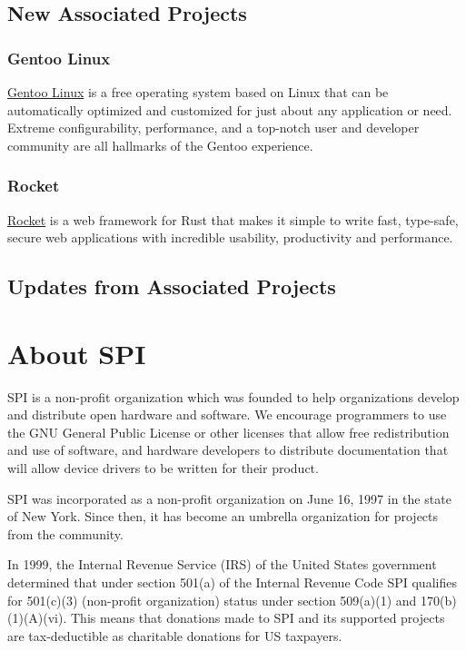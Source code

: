 \documentclass[a4paper]{report}
\begin{document}
\section{New Associated Projects}

\subsection{Gentoo Linux}

\href{https://www.gentoo.org/}{Gentoo Linux} is a free operating system based on Linux that can be automatically optimized and customized for just about any application or need. Extreme configurability, performance, and a top-notch user and developer community are all hallmarks of the Gentoo experience.

\subsection{Rocket}

\href{https://rocket.rs/}{Rocket} is a web framework for Rust that makes it simple to write fast, type-safe, secure web applications with incredible usability, productivity and performance.

\section{Updates from Associated Projects}

\appendix
\chapter{About SPI}

SPI is a non-profit organization which was founded to help organizations develop and distribute open hardware and software. We encourage programmers to use the GNU General Public License or other licenses that allow free redistribution and use of software, and hardware developers to distribute documentation that will allow device drivers to be written for their product.

SPI was incorporated as a non-profit organization on June 16, 1997 in the state of New York. Since then, it has become an umbrella organization for projects from the community.

In 1999, the Internal Revenue Service (IRS) of the United States government determined that under section 501(a) of the Internal Revenue Code SPI qualifies for 501(c)(3) (non-profit organization) status under section 509(a)(1) and 170(b)(1)(A)(vi). This means that donations made to SPI and its supported projects are tax-deductible as charitable donations for US taxpayers.
\end{document}
